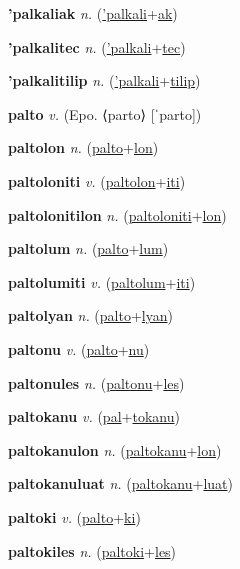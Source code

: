 \textbf{\hypertarget{'palkaliak}{'palkaliak}} \textit{n.} (\hyperlink{'palkali}{'palkali}+\allowbreak \hyperlink{ak}{ak})


\textbf{\hypertarget{'palkalitec}{'palkalitec}} \textit{n.} (\hyperlink{'palkali}{'palkali}+\allowbreak \hyperlink{tec}{tec})


\textbf{\hypertarget{'palkalitilip}{'palkalitilip}} \textit{n.} (\hyperlink{'palkali}{'palkali}+\allowbreak \hyperlink{tilip}{tilip})


\textbf{\hypertarget{palto}{palto}} \textit{v.} (Epo. ⟨parto⟩ [ˈparto])


\textbf{\hypertarget{paltolon}{paltolon}} \textit{n.} (\hyperlink{palto}{palto}+\allowbreak \hyperlink{lon}{lon})


\textbf{\hypertarget{paltoloniti}{paltoloniti}} \textit{v.} (\hyperlink{paltolon}{paltolon}+\allowbreak \hyperlink{iti}{iti})


\textbf{\hypertarget{paltolonitilon}{paltolonitilon}} \textit{n.} (\hyperlink{paltoloniti}{paltoloniti}+\allowbreak \hyperlink{lon}{lon})


\textbf{\hypertarget{paltolum}{paltolum}} \textit{n.} (\hyperlink{palto}{palto}+\allowbreak \hyperlink{lum}{lum})


\textbf{\hypertarget{paltolumiti}{paltolumiti}} \textit{v.} (\hyperlink{paltolum}{paltolum}+\allowbreak \hyperlink{iti}{iti})


\textbf{\hypertarget{paltolyan}{paltolyan}} \textit{n.} (\hyperlink{palto}{palto}+\allowbreak \hyperlink{lyan}{lyan})


\textbf{\hypertarget{paltonu}{paltonu}} \textit{v.} (\hyperlink{palto}{palto}+\allowbreak \hyperlink{nu}{nu})


\textbf{\hypertarget{paltonules}{paltonules}} \textit{n.} (\hyperlink{paltonu}{paltonu}+\allowbreak \hyperlink{les}{les})


\textbf{\hypertarget{paltokanu}{paltokanu}} \textit{v.} (\hyperlink{pal}{pal}+\allowbreak \hyperlink{tokanu}{tokanu})


\textbf{\hypertarget{paltokanulon}{paltokanulon}} \textit{n.} (\hyperlink{paltokanu}{paltokanu}+\allowbreak \hyperlink{lon}{lon})


\textbf{\hypertarget{paltokanuluat}{paltokanuluat}} \textit{n.} (\hyperlink{paltokanu}{paltokanu}+\allowbreak \hyperlink{luat}{luat})


\textbf{\hypertarget{paltoki}{paltoki}} \textit{v.} (\hyperlink{palto}{palto}+\allowbreak \hyperlink{ki}{ki})


\textbf{\hypertarget{paltokiles}{paltokiles}} \textit{n.} (\hyperlink{paltoki}{paltoki}+\allowbreak \hyperlink{les}{les})



